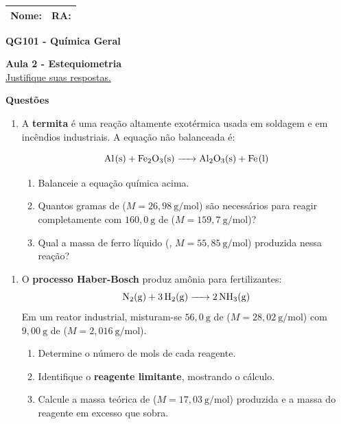 \documentclass[10pt,a4paper,ssfamily]{exam}
\newcommand{\nomera}{
  \noindent
  \begin{tabular}{|p{0.7\textwidth}|p{0.3\textwidth}|}
  Nome: & RA: \\
  \hline
  \end{tabular}
}
\newcommand{\qini}{\begin{enumerate}[resume]\item}
\newcommand{\qend}{\end{enumerate}}
\begin{document}
\sffamily
\pagestyle{empty}
\nomera

\begin{center}

{\bf QG101 - Química Geral}

{\bf Aula 2 - Estequiometria}\\
\underline{Justifique suas respostas.}
\end{center}

\begin{center}{\bf Questões}\end{center}

\qini
A \textbf{termita} é uma reação altamente exotérmica usada em soldagem
e em incêndios industriais. A equação não balanceada é:

\[
  \ce{Al(s) + Fe2O3(s) -> Al2O3(s) + Fe(l)}
\]

\begin{enumerate}
  \item Balanceie a equação química acima.
  \item Quantos gramas de  ($M = 26{,}98~\text{g/mol}$) são
        necessários para reagir completamente com $160{,}0~\text{g}$
        de  ($M = 159{,}7~\text{g/mol}$)?
  \item Qual a massa de ferro líquido (,
        $M = 55{,}85~\text{g/mol}$) produzida nessa reação?
\end{enumerate}

\vspace{2cm}
\qend

\qini
O \textbf{processo Haber-Bosch} produz amônia para fertilizantes:
\[
  \ce{N2(g) + 3 H2(g) -> 2 NH3(g)}
\]
Em um reator industrial, misturam-se $56{,}0~\text{g}$ de 
($M = 28{,}02~\text{g/mol}$) com $9{,}00~\text{g}$ de 
($M = 2{,}016~\text{g/mol}$).
\begin{enumerate}
  \item Determine o número de mols de cada reagente.
  \item Identifique o \textbf{reagente limitante}, mostrando o cálculo.
  \item Calcule a massa teórica de  ($M = 17{,}03~\text{g/mol}$)
        produzida e a massa do reagente em excesso que sobra.
\end{enumerate}

\vspace{2cm}
\qend
\end{document}
